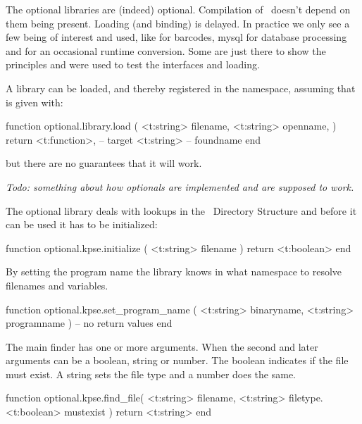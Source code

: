 \startsubsection[title=Loading]

The optional libraries are (indeed) optional. Compilation of \LUAMETATEX\ doesn't
depend on them being present. Loading (and binding) is delayed. In practice we
only see a few being of interest and used, like  for barcodes, \type
{mysql} for database processing and  for an occasional
runtime conversion. Some are just there to show the principles and were used to
test the interfaces and loading.

A library can be loaded, and thereby registered in the 
namespace, assuming that  is given with:

\starttyping[option=LUA]
function optional.library.load (
    <t:string> filename,
    <t:string> openname,
)
    return
        <t:function>, -- target
        <t:string>    -- foundname
end
\stoptyping

but there are no guarantees that it will work.

\stopsubsection

\startsubsection[title=Management]

{\em Todo: something about how optionals are implemented and are supposed to work.}

\stopsubsection

\startsubsection[title=TDS (kpse)]

The optional  library deals with lookups in the \TEX\ Directory
Structure and before it can be used it has to be initialized:

\starttyping[option=LUA]
function optional.kpse.initialize ( <t:string> filename )
    return <t:boolean>
end
\stoptyping

By setting the program name the library knows in what namespace to resolve
filenames and variables.

\starttyping[option=LUA]
function optional.kpse.set_program_name (
    <t:string> binaryname,
    <t:string> programname
)
    -- no return values
end
\stoptyping

The main finder has one or more arguments. When the second and later arguments
can be a boolean, string or number. The boolean indicates if the file must exist.
A string sets the file type and a number does the same.

\starttyping[option=LUA]
function optional.kpse.find_file(
    <t:string>  filename,
    <t:string>  filetype.
    <t:boolean> mustexist
)
    return <t:string>
end
\stoptyping

